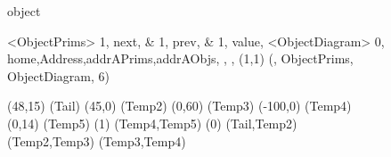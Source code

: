 \documentclass{article}
\begin{document}
\begin {figure}
\hspace{.05cm}
\Draw
 {object}

\Indirect \Table <ObjectPrims>
{  
	1, next, \THead &
    1, prev, \TTail &
    1, value, \TSize
}
\Indirect \Table <ObjectDiagram>
 {  0, home,Address,addrAPrims,addrAObjs, , , }
\Scale (1,1)
\OD (\TName, ObjectPrims, ObjectDiagram, 6)

\Move(48,15)
\FcNode(Tail)
\Move(45,0)
\FcNode(Temp2)
\Move(0,60)
\FcNode(Temp3)
\Move(-100,0)
\FcNode(Temp4)
\Move(0,14)
\FcNode(Temp5)
\ArrowHeads(1)
\Edge(Temp4,Temp5)
\ArrowHeads(0)
\Edge(Tail,Temp2)
\Edge(Temp2,Temp3)
\Edge(Temp3,Temp4)
\EndDraw

\caption {\Caption}

\label {fig:ObjectDiagram}

\end {figure}

\newpage

\newcommand{\numofnodesss}{5}
\end{document}
